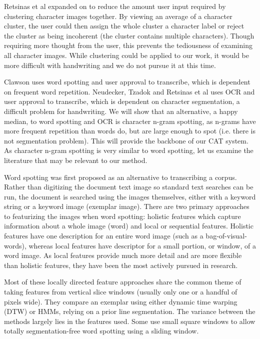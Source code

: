 \documentclass[ms]{byuprop}
\begin{document}
Retsinas et al\cite{Retsinas2015} expanded on \cite{Neudecker2010} to reduce the amount user input required by clustering character images together. By viewing an average of a character cluster, the user could then assign the whole cluster a character label or reject the cluster as being incoherent (the cluster contains multiple characters). Though requiring more thought from the user, this prevents the tediousness of examining all character images. While clustering could be applied to our work, it would be more difficult with handwriting and we do not pursue it at this time.



Clawson\cite{Clawson2014} uses word spotting and user approval to transcribe, which is dependent on frequent word repetition. Neudecker, Tzadok\cite{Neudecker2010} and Retsinas et al\cite{Retsinas2015} uses OCR and user approval to transcribe, which is dependent on character segmentation, a difficult problem for handwriting.
 We will show that an alternative, a happy median, to word spotting and OCR is character n-gram spotting, as n-grams have more frequent repetition than words do, but are large enough to spot (i.e. there is not segmentation problem). This will provide the backbone of our CAT system. As character n-gram spotting is very similar to word spotting, let us examine the literature that may be relevant to our method.

Word spotting was first proposed as an alternative to transcribing a corpus. Rather than digitizing the document text image so standard text searches can be run, the document is searched using the images themselves, either with a keyword string or a keyword image (exemplar image). There are two primary approaches to featurizing the images when word spotting: holistic features which capture information about a whole image (word) and local or sequential features\cite{Rodrıguez2008}. Holistic features have one description for an entire word image (such as a bag-of-visual-words), whereas local features have descriptor for a small portion, or window, of a word image. As local features provide much more detail and are more flexible than holistic features, they have been the most actively pursued in research.

Most of these locally directed feature approaches share the common theme of taking features from vertical slice windows (usually only one or a handful of pixels wide). They compare an exemplar using either dynamic time warping (DTW) or HMMs, relying on a prior line segmentation. The variance between the methods largely lies in the features used. Some use small square windows to allow totally segmentation-free word spotting using a sliding window\cite{Rothacker2013}.
\end{document}
